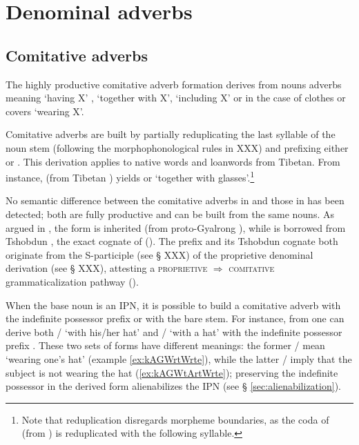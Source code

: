 \section{Denominal adverbs}

\subsection{Comitative adverbs} \label{sec:comitative.adverb}
The highly productive comitative adverb formation derives from nouns adverbs meaning `having X' , `together with X', `including X' or in the case of clothes or covers `wearing X'.

Comitative adverbs are built by partially reduplicating the last syllable of the noun stem (following the morphophonological rules in XXX) and prefixing either  or . This derivation applies to native words and loanwords from Tibetan. From instance,  (from Tibetan ) yields  or  `together with glasses'.\footnote{Note that reduplication disregards morpheme boundaries, as the coda of  (from ) is reduplicated with the following syllable. } 

No semantic difference between the comitative adverbs in  and those in  has been detected; both are fully productive and can be built from the same nouns. As argued in \citet{jacques17comitative}, the  form is inherited (from proto-Gyalrong ), while  is borrowed from Tshobdun , the exact cognate of   (\citealt[107]{jackson98morphology}). The prefix  and its Tshobdun cognate  both originate from the S-participle  (see § XXX) of the proprietive  denominal derivation (see § XXX), attesting a \textsc{proprietive} $\Rightarrow$ \textsc{comitative} grammaticalization pathway  (\citealt{jacques17comitative}). 

When the base noun is an IPN, it is possible to build a comitative adverb with the indefinite possessor prefix or with the bare stem. For instance, from  one can derive both  /  `with his/her hat' and  /   `with a hat' with the indefinite possessor prefix . These two sets of forms have different meanings: the former  /  mean `wearing one's hat' (example \ref{ex:kAGWrtWrte}), while the latter  /   imply that the subject is not wearing the hat (\ref{ex:kAGWtArtWrte}); preserving the indefinite possessor in the derived form alienabilizes the IPN (see § \ref{sec:alienabilization}).

